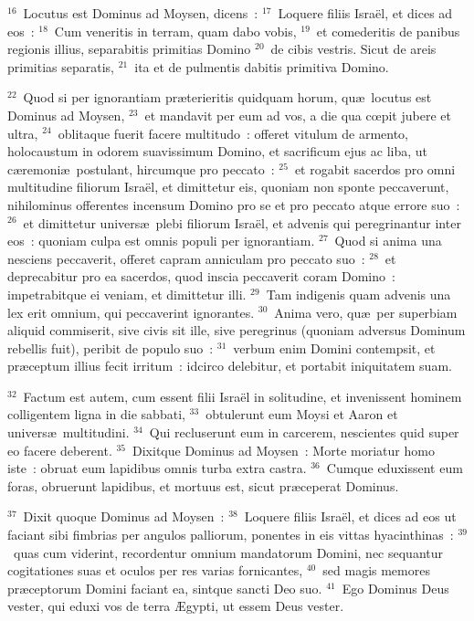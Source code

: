 ${}^{16}$~Locutus est Dominus ad Moysen, dicens~:
${}^{17}$~Loquere filiis Isra\"el, et dices ad eos~:
${}^{18}$~Cum veneritis in terram, quam dabo vobis,
${}^{19}$~et comederitis de panibus regionis illius, separabitis primitias Domino
${}^{20}$~de cibis vestris. Sicut de areis primitias separatis,
${}^{21}$~ita et de pulmentis dabitis primitiva Domino.


${}^{22}$~Quod si per ignorantiam pr\ae terieritis quidquam horum, qu\ae\ locutus est Dominus ad Moysen,
${}^{23}$~et mandavit per eum ad vos, a die qua cœpit jubere et ultra,
${}^{24}$~oblitaque fuerit facere multitudo~: offeret vitulum de armento, holocaustum in odorem suavissimum Domino, et sacrificum ejus ac liba, ut c\ae remoni\ae\ postulant, hircumque pro peccato~:
${}^{25}$~et rogabit sacerdos pro omni multitudine filiorum Isra\"el, et dimittetur eis, quoniam non sponte peccaverunt, nihilominus offerentes incensum Domino pro se et pro peccato atque errore suo~:
${}^{26}$~et dimittetur univers\ae\ plebi filiorum Isra\"el, et advenis qui peregrinantur inter eos~: quoniam culpa est omnis populi per ignorantiam.
${}^{27}$~Quod si anima una nesciens peccaverit, offeret capram anniculam pro peccato suo~:
${}^{28}$~et deprecabitur pro ea sacerdos, quod inscia peccaverit coram Domino~: impetrabitque ei veniam, et dimittetur illi.
${}^{29}$~Tam indigenis quam advenis una lex erit omnium, qui peccaverint ignorantes.
${}^{30}$~Anima vero, qu\ae\ per superbiam aliquid commiserit, sive civis sit ille, sive peregrinus (quoniam adversus Dominum rebellis fuit), peribit de populo suo~:
${}^{31}$~verbum enim Domini contempsit, et pr\ae ceptum illius fecit irritum~: idcirco delebitur, et portabit iniquitatem suam.


${}^{32}$~Factum est autem, cum essent filii Isra\"el in solitudine, et invenissent hominem colligentem ligna in die sabbati,
${}^{33}$~obtulerunt eum Moysi et Aaron et univers\ae\ multitudini.
${}^{34}$~Qui recluserunt eum in carcerem, nescientes quid super eo facere deberent.
${}^{35}$~Dixitque Dominus ad Moysen~: Morte moriatur homo iste~: obruat eum lapidibus omnis turba extra castra.
${}^{36}$~Cumque eduxissent eum foras, obruerunt lapidibus, et mortuus est, sicut pr\ae ceperat Dominus.


${}^{37}$~Dixit quoque Dominus ad Moysen~:
${}^{38}$~Loquere filiis Isra\"el, et dices ad eos ut faciant sibi fimbrias per angulos palliorum, ponentes in eis vittas hyacinthinas~:
${}^{39}$~quas cum viderint, recordentur omnium mandatorum Domini, nec sequantur cogitationes suas et oculos per res varias fornicantes,
${}^{40}$~sed magis memores pr\ae ceptorum Domini faciant ea, sintque sancti Deo suo.
${}^{41}$~Ego Dominus Deus vester, qui eduxi vos de terra \AE gypti, ut essem Deus vester.

